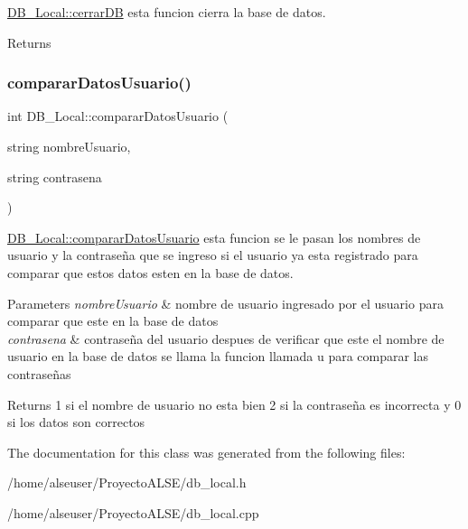 \hyperlink{class_d_b___local_aa5f3f6315c55e86a030da1c4c9b3a4cb}{D\+B\+\_\+\+Local\+::cerrar\+DB} esta funcion cierra la base de datos. 

\begin{DoxyReturn}{Returns}

\end{DoxyReturn}
\mbox{\label{class_d_b___local_a7812291d7772ef9b4a4e4bfe0cac3a09}} 
\subsubsection{\texorpdfstring{comparar\+Datos\+Usuario()}{compararDatosUsuario()}}
{\footnotesize\ttfamily int D\+B\+\_\+\+Local\+::comparar\+Datos\+Usuario (\begin{DoxyParamCaption}\item[{string}]{nombre\+Usuario,  }\item[{string}]{contrasena }\end{DoxyParamCaption})}



\hyperlink{class_d_b___local_a7812291d7772ef9b4a4e4bfe0cac3a09}{D\+B\+\_\+\+Local\+::comparar\+Datos\+Usuario} esta funcion se le pasan los nombres de usuario y la contraseña que se ingreso si el usuario ya esta registrado para comparar que estos datos esten en la base de datos. 


\begin{DoxyParams}{Parameters}
{\em nombre\+Usuario} & nombre de usuario ingresado por el usuario para comparar que este en la base de datos \\
\hline
{\em contrasena} & contraseña del usuario despues de verificar que este el nombre de usuario en la base de datos se llama la funcion llamada u para comparar las contraseñas \\
\hline
\end{DoxyParams}
\begin{DoxyReturn}{Returns}
1 si el nombre de usuario no esta bien 2 si la contraseña es incorrecta y 0 si los datos son correctos 
\end{DoxyReturn}


The documentation for this class was generated from the following files\+:\begin{DoxyCompactItemize}
\item 
/home/alseuser/\+Proyecto\+A\+L\+S\+E/db\+\_\+local.\+h\item 
/home/alseuser/\+Proyecto\+A\+L\+S\+E/db\+\_\+local.\+cpp\end{DoxyCompactItemize}
